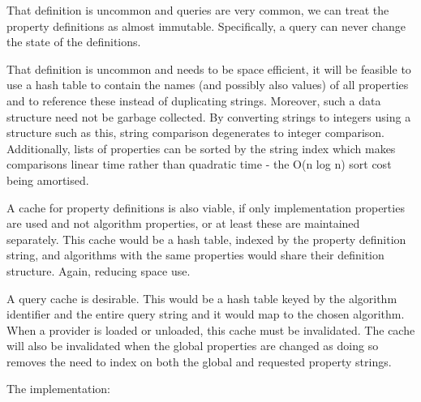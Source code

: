 \begin{DoxyItemize}
\item That definition is uncommon and queries are very common, we can treat the property definitions as almost immutable. Specifically, a query can never change the state of the definitions.
\item That definition is uncommon and needs to be space efficient, it will be feasible to use a hash table to contain the names (and possibly also values) of all properties and to reference these instead of duplicating strings. Moreover, such a data structure need not be garbage collected. By converting strings to integers using a structure such as this, string comparison degenerates to integer comparison. Additionally, lists of properties can be sorted by the string index which makes comparisons linear time rather than quadratic time -\/ the O(n log n) sort cost being amortised.
\item A cache for property definitions is also viable, if only implementation properties are used and not algorithm properties, or at least these are maintained separately. This cache would be a hash table, indexed by the property definition string, and algorithms with the same properties would share their definition structure. Again, reducing space use.
\item A query cache is desirable. This would be a hash table keyed by the algorithm identifier and the entire query string and it would map to the chosen algorithm. When a provider is loaded or unloaded, this cache must be invalidated. The cache will also be invalidated when the global properties are changed as doing so removes the need to index on both the global and requested property strings.
\end{DoxyItemize}

The implementation\+:


